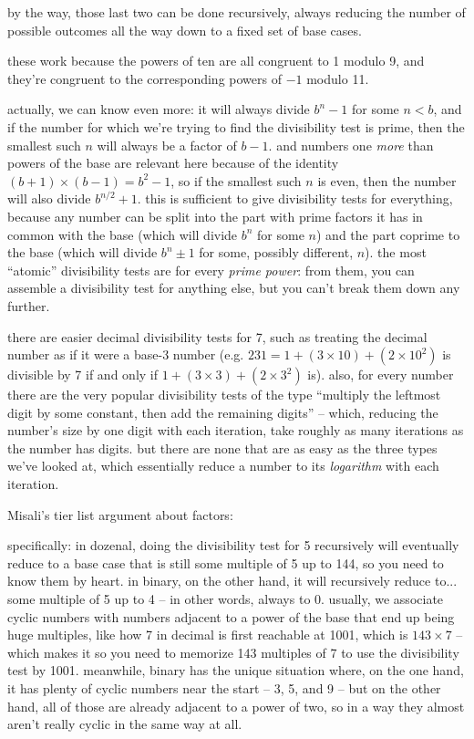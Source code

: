 \documentclass[../footnotes.tex]{subfiles}
\begin{document}

\myfootnote{} by the way, those last two can be done recursively, always reducing the number of possible outcomes all the way down to a fixed set of base cases.

\myfootnote{} these work because the powers of ten are all congruent to 1 modulo 9, and they're congruent to the corresponding powers of $-1$ modulo 11.

\myfootnote{} actually, we can know even more: it will always divide $b^n - 1$ for some $n < b$, and if the number for which we're trying to find the divisibility test is prime, then the smallest such $n$ will always be a factor of $b - 1$. and numbers one \emph{more} than powers of the base are relevant here because of the identity $(b + 1) \times (b - 1) = b^2 - 1$, so if the smallest such $n$ is even, then the number will also divide $b^{n/2} + 1$. this is sufficient to give divisibility tests for everything, because any number can be split into the part with prime factors it has in common with the base (which will divide $b^n$ for some $n$) and the part coprime to the base (which will divide $b^n \pm 1$ for some, possibly different, $n$). the most ``atomic'' divisibility tests are for every \emph{prime power}: from them, you can assemble a divisibility test for anything else, but you can't break them down any further.

\myfootnote{} there are easier decimal divisibility tests for 7, such as treating the decimal number as if it were a base-3 number (e.g. $231 = 1 + (3 \times 10) + (2 \times 10^2)$ is divisible by 7 if and only if $1 + (3 \times 3) + (2 \times 3^2)$ is). also, for every number there are the very popular divisibility tests of the type ``multiply the leftmost digit by some constant, then add the remaining digits'' -- which, reducing the number's size by one digit with each iteration, take roughly as many iterations as the number has digits. but there are none that are as easy as the three types we've looked at, which essentially reduce a number to its \emph{logarithm} with each iteration.

\myfootnote{} Misali's tier list argument about factors: \\

\myfootnote{} specifically: in dozenal, doing the divisibility test for 5 recursively will eventually reduce to a base case that is still some multiple of 5 up to 144, so you need to know them by heart. in binary, on the other hand, it will recursively reduce to... some multiple of 5 up to 4 -- in other words, always to 0. usually, we associate cyclic numbers with numbers adjacent to a power of the base that end up being huge multiples, like how 7 in decimal is first reachable at 1001, which is $143 \times 7$ -- which makes it so you need to memorize 143 multiples of 7 to use the divisibility test by 1001. meanwhile, binary has the unique situation where, on the one hand, it has plenty of cyclic numbers near the start -- 3, 5, and 9 -- but on the other hand, all of those are already adjacent to a power of two, so in a way they almost aren't really cyclic in the same way at all.
\end{document}
